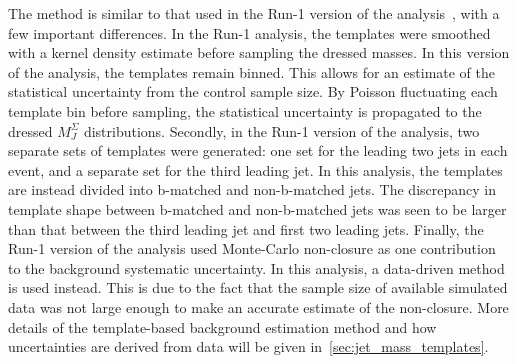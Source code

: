 The method is similar to that used in the Run-1 version of the analysis~\cite{run1-multijet}, with a few important differences.
In the Run-1 analysis, the templates were smoothed with a kernel density estimate before sampling the dressed masses.
In this version of the analysis, the templates remain binned.
This allows for an estimate of the statistical uncertainty from the control sample size.
By Poisson fluctuating each template bin before sampling, the statistical uncertainty is propagated to the dressed $M_J^{\Sigma}$ distributions.
Secondly, in the Run-1 version of the analysis, two separate sets of templates were generated: one set for the leading two jets in each event, and a separate set for the third leading jet.
In this analysis, the templates are instead divided into b-matched and non-b-matched jets.
The discrepancy in template shape between b-matched and non-b-matched jets was seen to be larger than that between the third leading jet and first two leading jets.
Finally, the Run-1 version of the analysis used Monte-Carlo non-closure as one contribution to the background systematic uncertainty.
In this analysis, a data-driven method is used instead.
This is due to the fact that the sample size of available simulated data was not large enough to make an accurate estimate of the non-closure.
More details of the template-based background estimation method and how uncertainties are derived from data will be given in~\ref{sec:jet_mass_templates}.